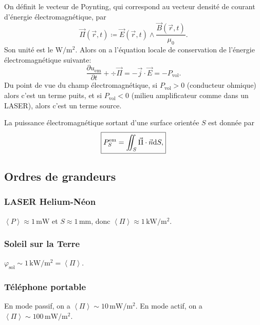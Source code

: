On définit le vecteur de Poynting, qui correspond au vecteur densité de courant d'énergie électromagnétique, par
\begin{equation}
    \boxed{
        \vec{\Pi}(\vec{r},t)\coloneqq\vec{E}(\vec{r},t)\wedge\frac{\vec{B}(\vec{r},t)}{\mu_0}.
    }
\end{equation}
Son unité est le $\si{\watt\per\metre\squared}$. Alors on a l'équation locale de conservation de l'énergie électromagnétique suivante:
\begin{equation}
    \boxed{
        \frac{\partial u_{\mathrm{em}}}{\partial t}+\div\vec{\Pi}=-\vec{j}\cdot\vec{E}=-P_{\mathrm{vol}}.
    }
\end{equation}
Du point de vue du champ électromagnétique, si $P_{\mathrm{vol}}>0$ (conducteur ohmique) alors c'est un terme \og puits\fg, et si $P_{\mathrm{vol}}<0$ (milieu amplificateur comme dans un LASER), alors c'est un terme \og source\fg.

La puissance électromagnétique sortant d'une surface orientée $S$ est donnée par
\begin{equation}
    \boxed{
        P_{S}^{\mathrm{em}}=\iint_{S}\vec{\Pi}\cdot\vec{n}\mathrm{d} S,
    }
\end{equation}

\subsection{Ordres de grandeurs}
\subsubsection{LASER Helium-Néon}
$\left\langle P\right\rangle\approx1\,\si{\milli\watt}$ et $S\approx1\,\si{\milli\metre}$, donc $\left\langle\Pi\right\rangle\approx1\,\si{\kilo\watt\per\metre\squared}$.

\subsubsection{Soleil sur la Terre}
$\varphi_{\mathrm{sol}}\sim1\,\si{\kilo\watt\per\metre\squared}=\left\langle\Pi\right\rangle$.

\subsubsection{Téléphone portable}
En mode \og passif\fg, on a $\left\langle\Pi\right\rangle\sim10\,\si{\milli\watt\per\metre\squared}$. En mode \og actif\fg, on a $\left\langle\Pi\right\rangle\sim100\,\si{\milli\watt\per\metre\squared}$.

